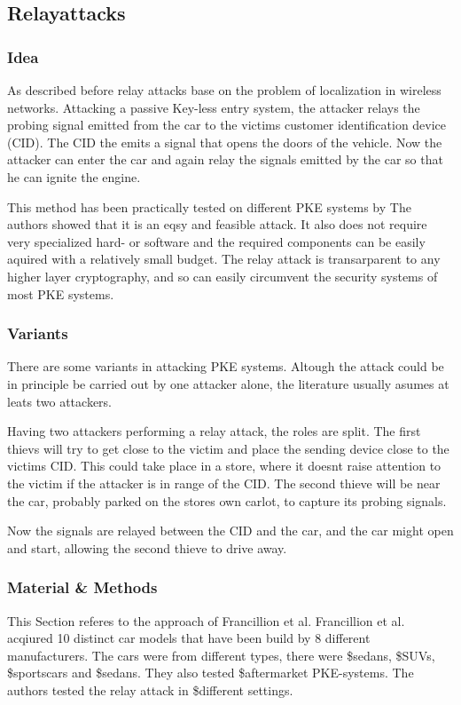 
\subsection{Relayattacks}
\subsubsection*{Idea}
	As described before relay attacks base on the problem of localization in
	wireless networks.
	Attacking a passive Key-less entry system,
	the attacker relays the probing signal emitted from the car to the victims
	customer identification device (CID).
	The CID the emits a signal that opens the doors of the vehicle.
	Now the attacker can enter the car and again relay the signals emitted by the
	car so that he can ignite the engine.
	
	This method has been practically tested on different PKE systems by %
	The authors showed that it is an eqsy and feasible attack.
	It also does not require very specialized hard- or software and
	the required components can be easily aquired with a relatively small budget.
	The relay attack is transarparent to any higher layer cryptography,	%
	and so can easily circumvent the security systems of most PKE systems.

\subsubsection*{Variants}
	There are some variants in attacking PKE systems.
	Altough the attack could be in principle be carried out by one attacker alone,
	the literature usually asumes at leats two attackers.

	\label{par:twoThies}
	Having two attackers performing a relay attack,
	the roles are split.
	The first thievs will try to get close to the victim and place
	the sending device close to the victims CID.
	This could take place in a store,
	where it doesnt raise attention to the victim if the attacker
	is in range of the CID.
	The second thieve will be near the car,
	probably parked on the stores own carlot,
	to capture its probing signals.

	Now the signals are relayed between the CID and the car,
	and the car might open and start,
	allowing the second thieve to drive away.

\subsubsection*{Material \& Methods}
This Section referes to the approach of Francillion et al. %
Francillion et al. %
acqiured 10 distinct car models that have been build by 8 different manufacturers.
The cars were from different types,
there were \$sedans, \$SUVs, \$sportscars  and \$sedans.
They also tested \$aftermarket PKE-systems.
The authors tested the relay attack in \$different settings.

